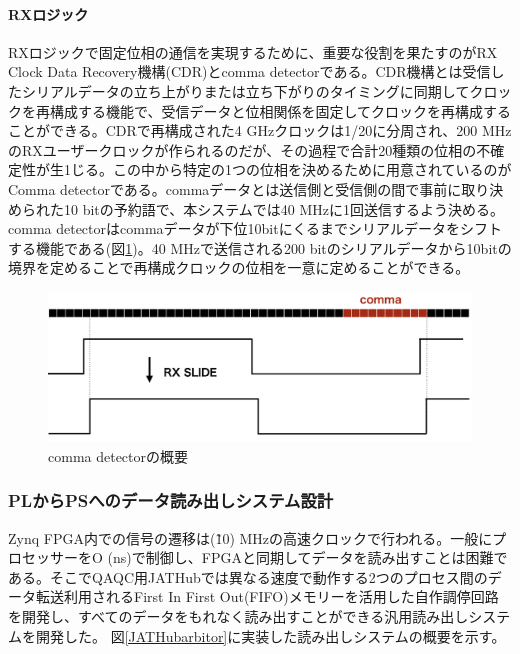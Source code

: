 \paragraph{RXロジック} \par
RXロジックで固定位相の通信を実現するために、重要な役割を果たすのがRX Clock Data Recovery機構(CDR)とcomma detectorである。CDR機構とは受信したシリアルデータの立ち上がりまたは立ち下がりのタイミングに同期してクロックを再構成する機能で、受信データと位相関係を固定してクロックを再構成することができる。CDRで再構成された4 GHzクロックは1/20に分周され、200 MHzのRXユーザークロックが作られるのだが、その過程で合計20種類の位相の不確定性が生1じる。この中から特定の1つの位相を決めるために用意されているのがComma detectorである。commaデータとは送信側と受信側の間で事前に取り決められた10 bitの予約語で、本システムでは40 MHzに1回送信するよう決める。comma detectorはcommaデータが下位10bitにくるまでシリアルデータをシフトする機能である(図\ref{JATHubcomma})。40 MHzで送信される200 bitのシリアルデータから10bitの境界を定めることで再構成クロックの位相を一意に定めることができる。

\begin{figure} 
\centering
\includegraphics[width=16cm]{fig/QAQC/JATHubcomma.png}
\caption[comma detectorの概要]{comma detectorの概要}
\label{JATHubcomma}
\end{figure}
\baselineskip


\subsubsection{PLからPSへのデータ読み出しシステム設計}
\baselineskip
\label{subsubsec_readout}

Zynq FPGA内での信号の遷移は(\~10) MHzの高速クロックで行われる。一般にプロセッサーをO (ns)で制御し、FPGAと同期してデータを読み出すことは困難である。そこでQAQC用JATHubでは異なる速度で動作する2つのプロセス間のデータ転送利用されるFirst In First Out(FIFO)メモリーを活用した自作調停回路を開発し、すべてのデータをもれなく読み出すことができる汎用読み出しシステムを開発した。
図\ref{JATHubarbitor}に実装した読み出しシステムの概要を示す。

